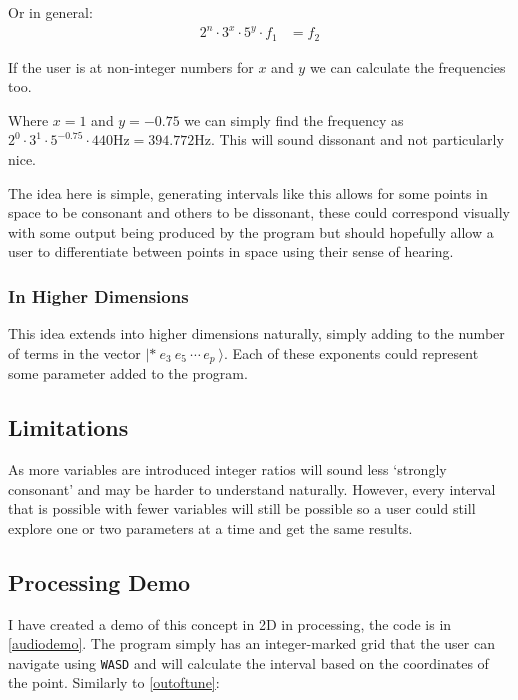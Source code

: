 Or in general:
\begin{align*}
    2^n \cdot 3^x \cdot 5^y \cdot f_1 &= f_2
\end{align*}

If the user is at non-integer numbers for $x$ and $y$ we can calculate the frequencies too.
\begin{figure}[H]
    \centering
    \caption{}
    \label{outoftune}
\end{figure}

Where $x=1$ and $y=-0.75$ we can simply find the frequency as $2^0 \cdot 3^1
\cdot 5^{-0.75} \cdot 440\si{\hertz} = 394.772\si{\hertz}$. This will sound
dissonant and not particularly nice.

The idea here is simple, generating intervals like this allows for some points
in space to be consonant and others to be dissonant, these could correspond
visually with some output being produced by the program but should hopefully
allow a user to differentiate between points in space using their sense of
hearing.

\subsubsection{In Higher Dimensions}
This idea extends into higher dimensions naturally, simply adding to the number
of terms in the vector $|*\ e_3\ e_5\ \cdots\, e_p\  \rangle$. Each of these
exponents could represent some parameter added to the program. 

\subsection{Limitations}
As more variables are introduced integer ratios will sound less `strongly
consonant' and may be harder to understand naturally. However, every interval
that is possible with fewer variables will still be possible so a user could
still explore one or two parameters at a time and get the same results.

\subsection{Processing Demo}
I have created a demo of this concept in 2D in processing, the code is in
\autoref{audiodemo}. The program simply has an integer-marked grid that the user
can navigate using \verb|WASD| and will calculate the interval based on the
coordinates of the point. Similarly to \autoref{outoftune}:

